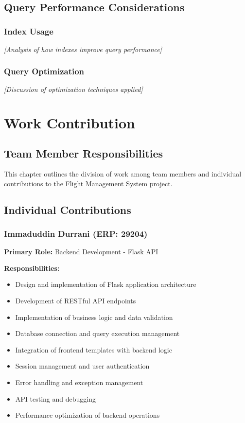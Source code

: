 \documentclass[12pt,a4paper,openany]{report}
\begin{document}
\section{Query Performance Considerations}

\subsection{Index Usage}
\textit{[Analysis of how indexes improve query performance]}

\subsection{Query Optimization}
\textit{[Discussion of optimization techniques applied]}

\newpage

\chapter{Work Contribution}

\section{Team Member Responsibilities}

This chapter outlines the division of work among team members and individual contributions to the Flight Management System project.

\section{Individual Contributions}

\subsection{Immaduddin Durrani (ERP: 29204)}

\textbf{Primary Role:} Backend Development - Flask API

\textbf{Responsibilities:}
\begin{itemize}
    \item Design and implementation of Flask application architecture
    \item Development of RESTful API endpoints
    \item Implementation of business logic and data validation
    \item Database connection and query execution management
    \item Integration of frontend templates with backend logic
    \item Session management and user authentication
    \item Error handling and exception management
    \item API testing and debugging
    \item Performance optimization of backend operations
\end{itemize}
\end{document}
